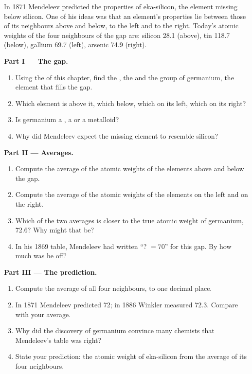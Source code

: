 \begin{problem}
\label{pb:g9:periodic-table-first-look:1}
In 1871 Mendeleev predicted the properties of eka-silicon, the element
missing below silicon. One of his ideas was that an element's properties
lie between those of its neighbours above and below, to the left and to
the right. Today's atomic weights of the four neighbours of the gap are:
silicon 28.1 (above), tin 118.7 (below), gallium 69.7 (left), arsenic
74.9 (right).

\medskip
\noindent\textbf{Part I --- The gap.}
\begin{enumerate}
  \item Using the  of this chapter, find the ,
        the  and the group of germanium, the element that fills
        the gap.
  \item Which element is above it, which below, which on its left, which
        on its right?
  \item Is germanium a , a  or a metalloid?
  \item Why did Mendeleev expect the missing element to resemble
        silicon?
\end{enumerate}

\medskip
\noindent\textbf{Part II --- Averages.}
\begin{enumerate}[resume]
  \item Compute the average of the atomic weights of the elements above
        and below the gap.
  \item Compute the average of the atomic weights of the elements on the
        left and on the right.
  \item Which of the two averages is closer to the true atomic weight of
        germanium, 72.6? Why might that be?
  \item In his 1869 table, Mendeleev had written ``? $= 70$'' for this
        gap. By how much was he off?
\end{enumerate}

\medskip
\noindent\textbf{Part III --- The prediction.}
\begin{enumerate}[resume]
  \item Compute the average of all four neighbours, to one decimal
        place.
  \item In 1871 Mendeleev predicted 72; in 1886 Winkler measured 72.3.
        Compare with your average.
  \item Why did the discovery of germanium convince many chemists that
        Mendeleev's table was right?
  \item State your prediction: the atomic weight of eka-silicon from the
        average of its four neighbours.
\end{enumerate}
\end{problem}
